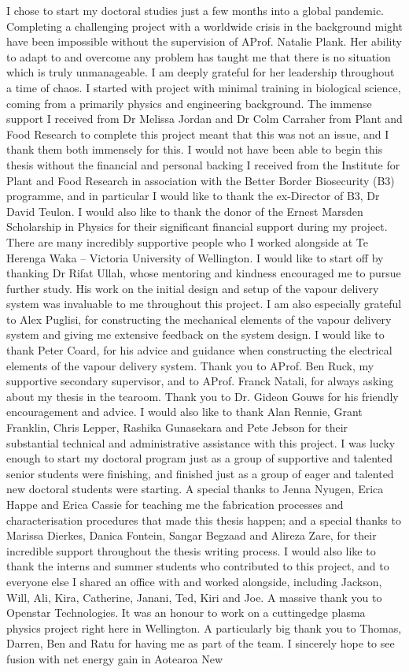 I chose to start my doctoral studies just a few months into a global pandemic. Completing a challenging project with a worldwide crisis in the background might have been impossible without the supervision of AProf. Natalie Plank. Her ability to adapt to and overcome any problem has taught me that there is no situation which is truly unmanageable. I am deeply grateful for her leadership throughout a time of chaos. I started with project with minimal training in biological science, coming from a primarily physics and engineering background. The immense support I received from Dr Melissa Jordan and Dr Colm Carraher from Plant and Food Research to complete this project meant that this was not an issue, and I thank them both immensely for this. I would not have been able to begin this thesis without the financial and personal backing I received from the Institute for Plant and Food Research in association with the Better Border Biosecurity (B3) programme, and in particular I would like to thank the ex-Director of B3, Dr David Teulon. I would also like to thank the donor of the Ernest Marsden Scholarship in Physics for their significant financial support during my project. There are many incredibly supportive people who I worked alongside at Te Herenga Waka – Victoria University of Wellington. I would like to start off by thanking Dr Rifat Ullah, whose mentoring and kindness encouraged me to pursue further study. His work on the initial design and setup of the vapour delivery system was invaluable to me throughout this project. I am also especially grateful to Alex Puglisi, for constructing the mechanical elements of the vapour delivery system and giving me extensive feedback on the system design. I would like to thank Peter Coard, for his advice and guidance when constructing the electrical elements of the vapour delivery system. Thank you to AProf. Ben Ruck, my supportive secondary supervisor, and to AProf. Franck Natali, for always asking about my thesis in the tearoom. Thank you to Dr. Gideon Gouws for his friendly encouragement and advice. I would also like to thank Alan Rennie, Grant Franklin, Chris Lepper, Rashika Gunasekara and Pete Jebson for their substantial technical and administrative assistance with this project. I was lucky enough to start my doctoral program just as a group of supportive and talented senior students were finishing, and finished just as a group of eager and talented new doctoral students were starting. A special thanks to Jenna Nyugen, Erica Happe and Erica Cassie for teaching me the fabrication processes and characterisation procedures that made this thesis happen; and a special thanks to Marissa Dierkes, Danica Fontein, Sangar Begzaad and Alireza Zare, for their incredible support throughout the thesis writing process. I would also like to thank the interns and summer students who contributed to this project, and to everyone else I shared an office with and worked alongside, including Jackson, Will, Ali, Kira, Catherine, Janani, Ted, Kiri and Joe. A massive thank you to Openstar Technologies. It was an honour to work on a cuttingedge plasma physics project right here in Wellington. A particularly big thank you to Thomas, Darren, Ben and Ratu for having me as part of the team. I sincerely hope to see fusion with net energy gain in Aotearoa New 
